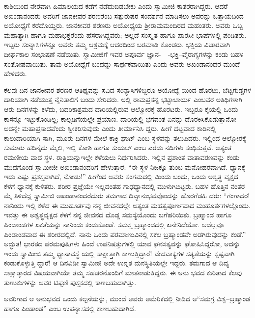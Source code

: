 ಕಾಶಿಯಿಂದ ನೇರವಾಗಿ ಹಿಮಾಲಯದ ಕಡೆಗೆ ನಡೆದುಬಿಡಬೇಕು ಎಂದು ಸ್ವಾಮೀಜಿ ಕಾತರರಾಗಿದ್ದರು. ಆದರೆ ಅಖಂಡಾನಂದರು ಅವರಿಗೆ ಜಾನಕೀವರ ಶರಣರೆಂಬ ಸತ್ಪುರುಷರ ಸಂದರ್ಶನ ಮಾಡಿಸಲು ಅವರನ್ನು ಒತ್ತಾಯದಿಂದ ಅಯೋಧ್ಯೆಗೆ ಕರೆದೊಯ್ದರು. ಜಾನಕೀವರ ಶರಣರು ಅಯೋಧ್ಯೆಯ ಶ್ರೀರಾಮಮಂದಿರದ ಮಹಂತರು. ಅವರು ಒಬ್ಬ ಮಹಾತ್ಯಾಗಿ ಹಾಗೂ ಮಹಾಭಕ್ತರೆಂದು ಹೆಸರಾಗಿದ್ದವರು; ಅಲ್ಲದೆ ಸಂಸ್ಕೃತ ಹಾಗೂ ಪಾರಸೀ ಭಾಷೆಗಳಲ್ಲಿ ಪಂಡಿತರು. ಇಬ್ಬರು ಸಂನ್ಯಾಸಿಗಳನ್ನೂ ಅವರು ತಮ್ಮ ಆಶ್ರಮಕ್ಕೆ ಆದರದಿಂದ ಬರಮಾಡಿ ಕೊಂಡರು. ಭಕ್ತಿಯ ವಿಚಾರವಾಗಿ ದೀರ್ಘಕಾಲ ಸಂಭಾಷಣೆ ನಡೆಯಿತು. ಸ್ವಾಮೀಜಿಗೆ ಇವರ ಅಪೂರ್ವ ಜ್ಞಾನ-~~-ಭಕ್ತಿ--ವೈರಾಗ್ಯಗಳನ್ನು ಕಂಡು ಬಹಳ ಸಂತೋಷವಾಯಿತು. ತಾವು ಅಯೋಧ್ಯೆಗೆ ಬಂದದ್ದು ಸಾರ್ಥಕವಾಯಿತು ಎಂದು ಅವರು ಅಖಂಡಾನಂದರ ಮುಂದೆ ಹೇಳಿದರು.

ಕೆಲವು ದಿನ ಜಾನಕೀವರ ಶರಣರ ಆತಿಥ್ಯವನ್ನು ಸವಿದ ಸಂನ್ಯಾಸಿಗಳಿಬ್ಬರೂ ಅಯೋಧ್ಯೆ ಯಿಂದ ಹೊರಟು, ಬೆಟ್ಟಗುಡ್ಡಗಳ ದಾರಿಯಾಗಿ ನಡೆಯುತ್ತ ನೈನಿತಾಲಿಗೆ ಬಂದು ಸೇರಿದರು. ಅಲ್ಲಿ ರಾಮಪ್ರಸನ್ನ ಭಟ್ಟಾಚಾರ್ಯ ಎಂಬವರ ಅತಿಥಿಗಳಾಗಿ ಆರು ದಿನಗಳನ್ನು ಕಳೆದು, ಬದರಿಕಾಶ್ರಮದ ದಾರಿಯಲ್ಲಿರುವ ಆಲ್ಮೋರಕ್ಕೆ ಹೊರಟರು. ಇಬ್ಬರೂ ಕೈಯಲ್ಲಿ ಒಂದು ಕಾಸನ್ನೂ ಇಟ್ಟುಕೊಂಡಿಲ್ಲ; ಕಾಲ್ನಡಿಗೆಯಲ್ಲೇ ಪ್ರಯಾಣ. ದಾರಿಯಲ್ಲಿ ಭಗವಂತ ಏನನ್ನು ದೊರಕಿಸಿಕೊಡುತ್ತಾನೋ ಅದನ್ನೇ ಮಹಾಪ್ರಸಾದವೆಂದು ಸ್ವೀಕರಿಸುವುದು ಎಂದು ತೀರ್ಮಾನಿಸಿ ದ್ದರು. ಹೀಗೆ ದಟ್ಟವಾದ ಕಾಡಿನಲ್ಲಿ ಕಾಲುದಾರಿಯಾಗಿ ಸಾಗಿ, ಮೂರು ದಿನಗಳ ಮೇಲೆ ಕಾಕ್ರಿ ಘಾಟ್ ಎಂಬ ಸ್ಥಳವನ್ನು ತಲುಪಿದರು. ಇಲ್ಲಿಂದ ಆಲ್ಮೋರಕ್ಕೆ ಸುಮಾರು ಹದಿನೈದು ಮೈಲಿ, ಇಲ್ಲಿ ಕೋಶಿ ಹಾಗೂ ಸುಯಲ್ ಎಂಬ ಎರಡು ನದಿಗಳು ಸಂಧಿಸುತ್ತವೆ. ಅತ್ಯಂತ ರಮಣೀಯ ವಾದ ಸ್ಥಳ. ರಾತ್ರಿಯನ್ನುಇಲ್ಲೇ ಕಳೆಯಲು ನಿರ್ಧರಿಸಿದರು. ಇಲ್ಲಿನ ಪ್ರಶಾಂತ ವಾತಾವರಣವನ್ನು ಕಂಡು ಮುದಗೊಂಡ ಸ್ವಾಮೀಜೀ ಅಖಂಡಾನಂದರಿಗೆ ಹೇಳುತ್ತಾರೆ: “ಈ ಸ್ಥಳ ನಿಜಕ್ಕೂ ತುಂಬ ಮನೋಹರವಾಗಿದೆ. ಧ್ಯಾನಕ್ಕೆ ಇದು ಎಷ್ಟು ಪ್ರಶಸ್ತವಾಗಿದೆ, ನೋಡು!” ಹೀಗೆಂದ ಅವರು ಸಂಗಮದಲ್ಲಿ ಮಿಂದು ಬಂದು, ಒಂದು ಅಶ್ವತ್ಥ ವೃಕ್ಷದ ಕೆಳಗೆ ಧ್ಯಾನಕ್ಕೆ ಕುಳಿತರು. ಶರೀರ ಪ್ರಜ್ಞೆಯೇ ಇಲ್ಲದಂತಹ ಗಾಢಧ್ಯಾನದಲ್ಲಿ ಮುಳುಗಿಬಿಟ್ಟರು. ಬಹಳ ಹೊತ್ತಿನ ನಂತರ ಮೈ ತಿಳಿದೆದ್ದ ಸ್ವಾಮೀಜಿ ಅಖಂಡಾನಂದರೆದುರು ತಮಗಾದ ದಿವ್ಯಾನುಭವವೊಂದನ್ನು ಹೊರಗೆಡಹಿ ದರು: “ಗಂಗಾಧರ! ನಾನಿಂದು ಇಲ್ಲಿ ಕಳೆದ ಈ ಮುಹೂರ್ತವು ನನ್ನ ಜೀವನದಲ್ಲೇ ಅತ್ಯಂತ ಮಹತ್ವಪೂರ್ಣವಾದ ಮುಹೂರ್ತಗಳಲ್ಲೊಂದು. ಇವತ್ತು ಈ ಅಶ್ವತ್ಥವೃಕ್ಷದ ಕೆಳಗೆ ನನ್ನ ಜೀವನದ ದೊಡ್ಡ ಸಮಸ್ಯೆಯೊಂದು ಬಗೆಹರಿಯಿತು. ಬ್ರಹ್ಮಾಂಡ ಹಾಗೂ ಪಿಂಡಾಂಡಗಳ ಏಕತೆಯನ್ನು ನಾನಿಂದು ಕಂಡುಕೊಂಡೆ. ಸಮಸ್ತ ಬ್ರಹ್ಮಾಂಡದಲ್ಲಿ ಏನೇನಿದೆಯೋ. ಅದೆಲ್ಲವೂ ಪಿಂಡಾಂಡವಾದ ಈ ಶರೀರದಲ್ಲಿದೆ. ನಾನು ಒಂದು ಪರಮಾಣುವಿನಲ್ಲಿ ಸಕಲ ಬ್ರಹ್ಮಾಂಡವೇ ಅಡಗಿರುವುದನ್ನು ಕಂಡೆ.” ಅದ್ಭುತ! ಭಾರತದ ಪರಮಪುಷಿಗಳು ಹಿಂದೆ ಉಪನಿಷತ್ತುಗಳಲ್ಲಿ ಯಾವ ಘನಸತ್ಯವನ್ನು ಘೋಷಿಸಿದ್ದರೋ, ಅದನ್ನು ಇಂದು ಸ್ವಾಮೀಜಿ ತಮ್ಮ ಧ್ಯಾನಾವಸ್ಥೆ ಯಲ್ಲಿ ಸಾಕ್ಷಾತ್ತಾಗಿ ಕಾಣುತ್ತಿದ್ದಾರೆ! ವೇದವಾಕ್ಯಗಳ ಸತ್ಯತೆಯನ್ನು ಸ್ಪಷ್ಟವಾಗಿ ಕಂಡುಕೊಳ್ಳುತ್ತಿ ದ್ದಾರೆ! ಆ ದಿನವಿಡೀ ಸ್ವಾಮೀಜಿ ಅದೇ ಉನ್ನತ ಮನಸ್ಥಿತಿಯಲ್ಲೇ ಇದ್ದರು. ತಮಗಾದ ಆ ದಿವ್ಯ ಸಾಕ್ಷಾತ್ಕಾರದ ವಿಷಯವಾಗಿಯೇ ತಮ್ಮ ಸಹಚರನೊಂದಿಗೆ ಮಾತನಾಡುತ್ತಿದ್ದರು. ಈ ಅನು ಭವದ ಕುರಿತಾದ ಕೆಲವು ತುಣುಕುಗಳನ್ನು ಅವರ ಟಿಪ್ಪಣಿ ಪುಸ್ತಕದಲ್ಲಿ ಕಾಣಬಹುದಾಗಿತ್ತು.

ಅವರಿಗಾದ ಆ ಅನುಭವದ ಒಂದು ಕಲ್ಪನೆಯನ್ನು, ಮುಂದೆ ಅವರು ಅಮೆರಿಕದಲ್ಲಿ ನೀಡಿದ ಅ“ಸಮಗ್ರ ವಿಶ್ವ–ಬ್ರಹ್ಮಾಂಡ ಹಾಗೂ ಪಿಂಡಾಂಡ” ಎಂಬ ಉಪನ್ಯಾಸದಲ್ಲಿ ಕಾಣಬಹುದಾಗಿದೆ.

